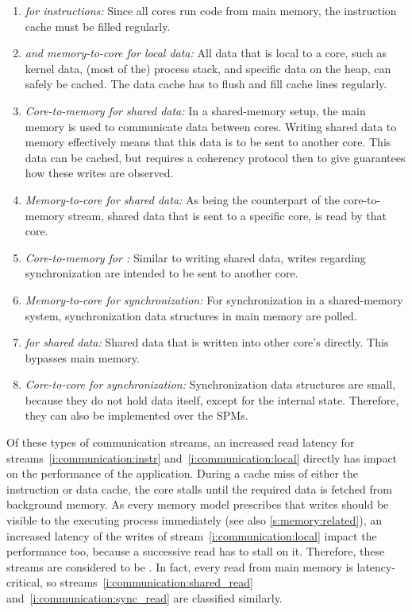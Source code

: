 \begin{enumerate}
\item \emph{ for instructions:}\label{i:communication:instr}
	Since all cores run code from main memory, the instruction cache must be filled regularly.
\item \emph{ and memory-to-core for local data:}\label{i:communication:local}
	All data that is local to a core, such as kernel data, (most of the) process stack, and specific data on the heap, can safely be cached.
	The data cache has to flush and fill cache lines regularly.
\item \emph{Core-to-memory for shared data:}\label{i:communication:shared_write}
	In a shared-memory setup, the main memory is used to communicate data between cores.
	Writing shared data to memory effectively means that this data is to be sent to another core.
	This data can be cached, but requires a coherency protocol then to give guarantees how these writes are observed.
\item \emph{Memory-to-core for shared data:}\label{i:communication:shared_read}
	As being the counterpart of the core-to-memory stream, shared data that is sent to a specific core, is read by that core.
\item \emph{Core-to-memory for :}\label{i:communication:sync_write}
	Similar to writing shared data, writes regarding synchronization are intended to be sent to another core.
\item \emph{Memory-to-core for synchronization:}\label{i:communication:sync_read}
	For synchronization in a shared-mem\-ory system, synchronization data structures in main memory are polled.
\item \emph{ for shared data:}\label{i:communication:direct}
	Shared data that is written into other core's  directly.
	This bypasses main memory.
\item \emph{Core-to-core for synchronization:}\label{i:communication:direct_sync}
	Synchronization data structures are small, because they do not hold data itself, except for the internal state.
	Therefore, they can also be implemented over the \acp{SPM}.
\end{enumerate}

Of these types of communication streams, an increased read latency for streams~\ref{i:communication:instr} and~\ref{i:communication:local} directly has impact on the performance of the application.
During a cache miss of either the instruction or data cache, the core stalls until the required data is fetched from background memory.
As every memory model prescribes that writes should be visible to the executing process immediately (see also \cref{s:memory:related}), an increased latency of the writes of stream~\ref{i:communication:local} impact the performance too, because a successive read has to stall on it.
Therefore, these streams are considered to be \emph{}.
In fact, every read from main memory is latency-critical, so streams~\ref{i:communication:shared_read} and~\ref{i:communication:sync_read} are classified similarly.

